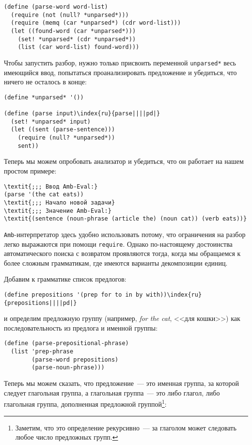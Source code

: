 \begin{Verbatim}[fontsize=\small]
(define (parse-word word-list)
  (require (not (null? *unparsed*)))
  (require (memq (car *unparsed*) (cdr word-list)))
  (let ((found-word (car *unparsed*)))
    (set! *unparsed* (cdr *unparsed*))
    (list (car word-list) found-word)))
\end{Verbatim}

Чтобы запустить разбор, нужно только присвоить переменной
{\tt *unparsed*} весь имеющийся ввод, попытаться
проанализировать предложение и убедиться, что ничего не осталось в
конце:

\begin{Verbatim}[fontsize=\small]
(define *unparsed* '())

(define (parse input)\index{ru}{parse||||pd|}
  (set! *unparsed* input)
  (let ((sent (parse-sentence)))
    (require (null? *unparsed*))
    sent))
\end{Verbatim}

Теперь мы можем опробовать анализатор и убедиться, что он
работает на нашем простом примере:

\begin{Verbatim}[fontsize=\small]
\textit{;;; Ввод Amb-Eval:}
(parse '(the cat eats))
\textit{;;; Начало новой задачи}
\textit{;;; Значение Amb-Eval:}
\textit{(sentence (noun-phrase (article the) (noun cat)) (verb eats))}
\end{Verbatim}

{\tt Amb}-интерпретатор здесь удобно использовать потому,
что ограничения на разбор легко выражаются при помощи
{\tt require}. Однако по-настоящему достоинства автоматического поиска
с возвратом проявляются тогда, когда мы обращаемся
к более сложным грамматикам, где имеются варианты декомпозиции
единиц.

Добавим к грамматике список предлогов:

\begin{Verbatim}[fontsize=\small]
(define prepositions '(prep for to in by with))\index{ru}{prepositions||||pd|}
\end{Verbatim}
и определим предложную группу (например, {\em for the cat},
<<для кошки>>) как последовательность из предлога и именной группы:

\begin{Verbatim}[fontsize=\small]
(define (parse-prepositional-phrase)
  (list 'prep-phrase
        (parse-word prepositions)
        (parse-noun-phrase)))
\end{Verbatim}
Теперь мы можем сказать, что предложение~--- это именная группа, за
которой следует глагольная группа, а глагольная группа~--- это либо
глагол, либо глагольная группа, дополненная предложной
группой\footnote{Заметим, что это определение рекурсивно~--- за
глаголом может следовать любое число предложных групп.}:


